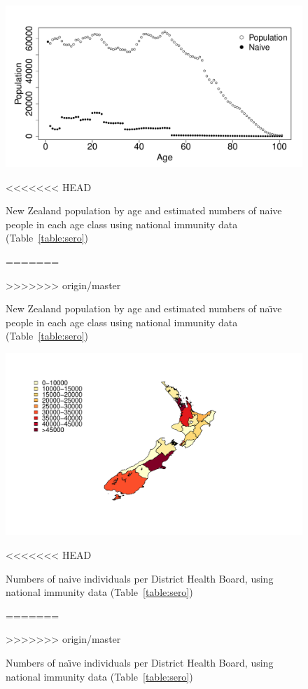 \documentclass{article}
\begin{document}
\begin{itemize}
\begin{figure}
\begin{center}
\includegraphics{draftfinalreport-023}
\end{center}
<<<<<<< HEAD
\caption{New Zealand population by age and estimated numbers of naive people in each age class using national immunity data (Table~\ref{table:sero})}
=======
\caption{New Zealand population by age and estimated numbers of na\"{\i}ve people in each age class using national immunity data (Table~\ref{table:sero})}
>>>>>>> origin/master
\label{fig:naive}
\end{figure}

\begin{figure}[H]
     \begin{center}
     \includegraphics[width=1.2\textwidth]{naive_map.pdf}
     \end{center}
<<<<<<< HEAD
     \caption{Numbers of naive individuals per District Health Board, using national immunity data (Table~\ref{table:sero})}
=======
     \caption{Numbers of na\"{\i}ve individuals per District Health Board, using national immunity data (Table~\ref{table:sero})}
>>>>>>> origin/master
     \label{fig:naive_map}
\end{figure}


\end{itemize}
\end{document}

